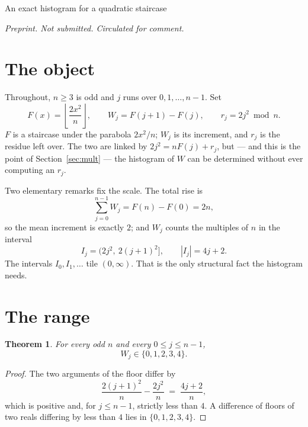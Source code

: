 \documentclass[11pt,reqno]{amsart}
\theoremstyle{plain}
\newtheorem{theorem}{Theorem}
\theoremstyle{remark}
\numberwithin{equation}{section}
\newcommand{\fl}[1]{\left\lfloor #1 \right\rfloor}
\begin{document}
\maketitle

%
        {An exact histogram for a quadratic staircase}

\begin{center}
\emph{Preprint. Not submitted. Circulated for comment.}
\end{center}

\bigskip

\section{The object}

Throughout, $n \ge 3$ is odd and $j$ runs over $0,1,\dots,n-1$. Set
\[
  F(x) = \fl{\frac{2x^2}{n}}, \qquad W_j = F(j+1)-F(j), \qquad
  r_j = 2j^2 \bmod n .
\]
$F$ is a staircase under the parabola $2x^2/n$; $W_j$ is its increment, and
$r_j$ is the residue left over. The two are linked by $2j^2 = nF(j) + r_j$, but
--- and this is the point of Section~\ref{sec:mult} --- the histogram of $W$ can
be determined without ever computing an $r_j$.

Two elementary remarks fix the scale. The total rise is
\[
  \sum_{j=0}^{n-1} W_j = F(n)-F(0) = 2n,
\]
so the mean increment is exactly $2$; and $W_j$ counts the multiples of $n$ in
the interval
\begin{equation}\label{eq:interval}
  I_j = \bigl(2j^2,\ 2(j+1)^2\bigr], \qquad |I_j| = 4j+2 .
\end{equation}
The intervals $I_0, I_1, \dots$ tile $(0,\infty)$. That is the only structural
fact the histogram needs.

\section{The range}

\begin{theorem}\label{thm:range}
For every odd $n$ and every $0 \le j \le n-1$,
\[
  W_j \in \{0,1,2,3,4\}.
\]
\end{theorem}

\begin{proof}
The two arguments of the floor differ by
\[
  \frac{2(j+1)^2}{n}-\frac{2j^2}{n} \;=\; \frac{4j+2}{n},
\]
which is positive and, for $j \le n-1$, strictly less than $4$. A difference of
floors of two reals differing by less than $4$ lies in $\{0,1,2,3,4\}$.
\end{proof}
\end{document}
